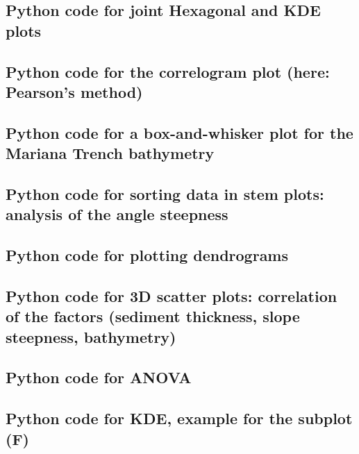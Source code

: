 \documentclass[11pt,a4paper]{report}
\begin{document}
{\begin{appendices}
\subsection{Python code for joint Hexagonal and KDE plots}\label{P:09}


\subsection{Python code for the correlogram plot (here: Pearson's method)}\label{P:10}


\subsection{Python code for a box-and-whisker plot for the Mariana Trench bathymetry}\label{P:11}


\subsection{Python code for sorting data in stem plots: analysis of the angle steepness}\label{P:12}


\subsection{Python code for plotting dendrograms}\label{P:13}	


\subsection{Python code for 3D scatter plots: correlation of the factors (sediment thickness, slope steepness, bathymetry)}\label{P:14}


\subsection{Python code for ANOVA}\label{P:15}


\subsection{Python code for \ac{KDE}, example for the subplot (F)}\label{P:16}



\end{appendices}}
\end{document}
